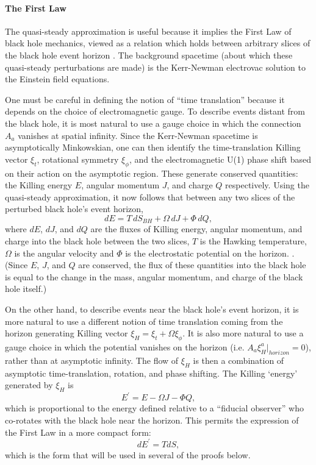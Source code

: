 \documentclass{article}
\begin{document}
\paragraph{The First Law}

The quasi-steady approximation is useful because it implies the First Law \cite{BCH73}\cite{GW01} of black hole mechanics, viewed as a relation which holds between arbitrary slices of the black hole event horizon \cite{SCD81}\cite{JP03}.  The background spacetime (about which these quasi-steady perturbations are made) is the Kerr-Newman electrovac solution to the Einstein field equations.

One must be careful in defining the notion of ``time translation'' because it depends on the choice of electromagnetic gauge.  To describe events distant from the black hole, it is most natural to use a gauge choice in which the connection $A_a$ vanishes at spatial infinity.  Since the Kerr-Newman spacetime is asymptotically Minkowskian, one can then identify the time-translation Killing vector $\xi_t$, rotational symmetry $\xi_{\phi}$, and the electromagnetic U(1) phase shift based on their action on the asymptotic region.  These generate conserved quantities: the Killing energy $E$, angular momentum $J$, and charge $Q$ respectively.  Using the quasi-steady approximation, it now follows that between any two slices of the perturbed black hole's event horizon,
\begin{equation}\label{FIRST}
dE = T\,dS_{BH} + \Omega\,dJ + \Phi\,dQ,
\end{equation}
where $dE$, $dJ$, and $dQ$ are the fluxes of Killing energy, angular momentum, and charge into the black hole between the two slices, $T$ is the Hawking temperature, $\Omega$ is the angular velocity and $\Phi$ is the electrostatic potential on the horizon. \cite{SCD81}\cite{GW01}.  (Since $E$, $J$, and $Q$ are conserved, the flux of these quantities into the black hole is equal to the change in the mass, angular momentum, and charge of the black hole itself.)

On the other hand, to describe events near the black hole's event horizon, it is more natural to use a different notion of time translation coming from the horizon generating Killing vector $\xi_H = \xi_t + \Omega \xi_{\phi}$.  It is also more natural to use a gauge choice in which the potential vanishes on the horizon (i.e. $A_a \xi^a_H|_{horizon} = 0$), rather than at asymptotic infinity.  The flow of $\xi_H$ is then a combination of asymptotic time-translation, rotation, and phase shifting.  The Killing `energy' generated by $\xi_{H}$ is
\begin{equation}
E^{\prime} = E - \Omega J - \Phi Q,
\end{equation}
which is proportional to the energy defined relative to a ``fiducial observer'' who co-rotates with the black hole near the horizon.  This permits the expression of the First Law in a more compact form:
\begin{equation}\label{first}
dE^{\prime} = T dS,
\end{equation}
which is the form that will be used in several of the proofs below.
\end{document}
